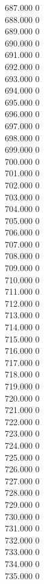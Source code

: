 { 687.000	0 \\
 688.000	0 \\
 689.000	0 \\
 690.000	0 \\
 691.000	0 \\
 692.000	0 \\
 693.000	0 \\
 694.000	0 \\
 695.000	0 \\
 696.000	0 \\
 697.000	0 \\
 698.000	0 \\
 699.000	0 \\
 700.000	0 \\
 701.000	0 \\
 702.000	0 \\
 703.000	0 \\
 704.000	0 \\
 705.000	0 \\
 706.000	0 \\
 707.000	0 \\
 708.000	0 \\
 709.000	0 \\
 710.000	0 \\
 711.000	0 \\
 712.000	0 \\
 713.000	0 \\
 714.000	0 \\
 715.000	0 \\
 716.000	0 \\
 717.000	0 \\
 718.000	0 \\
 719.000	0 \\
 720.000	0 \\
 721.000	0 \\
 722.000	0 \\
 723.000	0 \\
 724.000	0 \\
 725.000	0 \\
 726.000	0 \\
 727.000	0 \\
 728.000	0 \\
 729.000	0 \\
 730.000	0 \\
 731.000	0 \\
 732.000	0 \\
 733.000	0 \\
 734.000	0 \\
 735.000	0 \\
}
